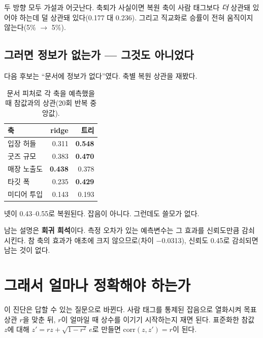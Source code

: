 \documentclass[10pt]{article}
\begin{document}
두 방향 모두 가설과 어긋난다. 축퇴가 사실이면 복원 축이 사람 태그보다 \emph{더}
상관돼 있어야 하는데 덜 상관돼 있다(0.177 대 0.236). 그리고 직교화로 승률이
전혀 움직이지 않는다(5\% $\to$ 5\%).


\subsection{그러면 정보가 없는가 --- 그것도 아니었다}

다음 후보는 ``문서에 정보가 없다''였다. 축별 복원 상관을 재봤다.

\begin{table}[t]
\centering\tsize
\caption{문서 피처로 각 축을 예측했을 때 참값과의 상관(20회 반복 중앙값).}
\begin{tabular}{lrr}
\toprule
축 & ridge & 트리 \\
\midrule
입장 허들   & 0.311 & \textbf{0.548} \\
굿즈 규모   & 0.383 & \textbf{0.470} \\
매장 노출도 & \textbf{0.438} & 0.378 \\
타깃 폭     & 0.235 & \textbf{0.429} \\
\midrule
미디어 투입 & 0.143 & 0.193 \\
\bottomrule
\end{tabular}
\end{table}

넷이 0.43--0.55로 복원된다. 잡음이 아니다. 그런데도 쓸모가 없다.

남는 설명은 \textbf{회귀 희석}이다. 측정 오차가 있는 예측변수는 그 효과를 신뢰도만큼
감쇠시킨다. 참 축의 효과가 애초에 크지 않으므로(차이 $-$0.0313), 신뢰도 0.45로
감쇠되면 남는 것이 없다.

\section{그래서 얼마나 정확해야 하는가}

이 진단은 답할 수 있는 질문으로 바뀐다. 사람 태그를 통제된 잡음으로 열화시켜
목표 상관 $r$을 맞춘 뒤, $r$이 얼마일 때 상수를 이기기 시작하는지 재면 된다.
표준화한 참값 $z$에 대해 $z' = r z + \sqrt{1-r^2}\,e$로 만들면
$\mathrm{corr}(z, z') = r$이 된다.
\end{document}
